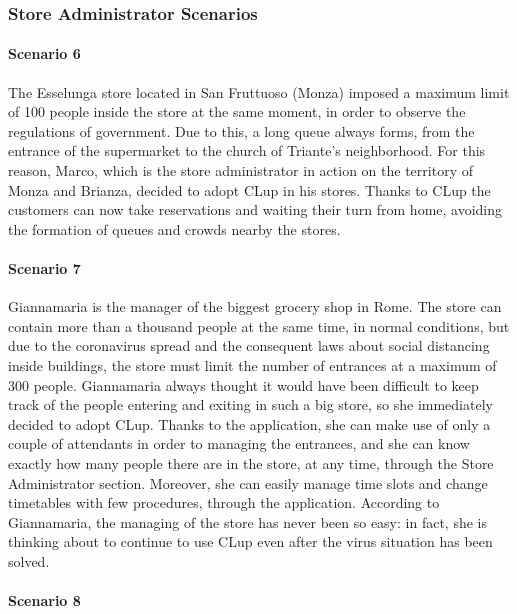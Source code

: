 \documentclass[table, 12pt]{article}
\begin{document}
\subsubsection{Store Administrator Scenarios}
\paragraph{Scenario 6}

The Esselunga store located in San Fruttuoso (Monza) imposed a maximum limit of 100 people inside the store at the same moment, in order to observe the regulations of government. Due to this, a long queue always forms, from the entrance of the supermarket to the church of Triante's neighborhood. For this reason, Marco, which is the store administrator in action on the territory of Monza and Brianza, decided to adopt CLup in his stores.
Thanks to CLup the customers can now take reservations and waiting their turn from home, avoiding the formation of queues and crowds nearby the stores.\\




\paragraph{Scenario 7}

Giannamaria is the manager of the biggest grocery shop in Rome. The store can contain more than a thousand people at the same time, in normal conditions, but due to the coronavirus spread and the consequent laws about social distancing inside buildings, the store must limit the number of entrances at a maximum of 300 people. Giannamaria always thought it would have been difficult to keep track of the people entering and exiting in such a big store, so she immediately decided to adopt CLup. Thanks to the application, she can make use of only a couple of attendants in order to managing the entrances, and she can know exactly how many people there are in the store, at any time, through the Store Administrator section. Moreover, she can easily manage time slots and change timetables with few procedures, through the application. According to Giannamaria, the managing of the store has never been so easy: in fact, she is thinking about to continue to use CLup even after the virus situation has been solved.


\paragraph{Scenario 8}
\end{document}
